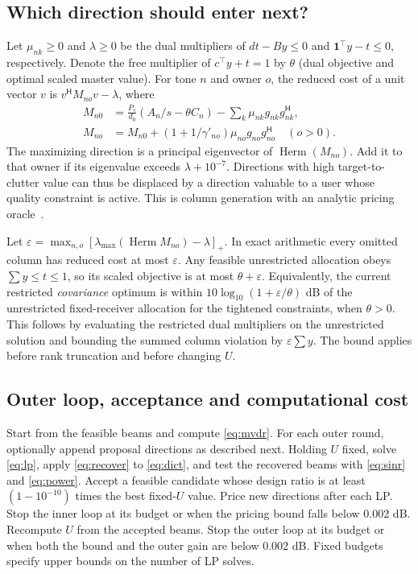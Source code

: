 \documentclass[journal]{IEEEtran}
\DeclareMathOperator{\Herm}{Herm}
\newcommand{\Hh}{^{\mathsf H}}
\begin{document}
\subsection{Which direction should enter next?}
Let $\mu_{nk}\ge0$ and $\lambda\ge0$ be the dual multipliers of $dt-By\le0$ and $\mathbf1^\top y-t\le0$, respectively. Denote the free multiplier of $c^\top y+t=1$ by $\theta$ (dual objective and optimal scaled master value). For tone $n$ and owner $o$, the reduced cost of a unit vector $v$ is $v\Hh M_{no}v-\lambda$, where
\begin{align}
 M_{n0}&=\frac{P_s}{d_0}(A_n/s-\theta C_n)
                -\sum_k\mu_{nk}g_{nk}g_{nk}\Hh,\\
 M_{no}&=M_{n0}+(1+1/\gamma'_{no})\mu_{no}g_{no}g_{no}\Hh
                  \quad(o>0).
\end{align}
The maximizing direction is a principal eigenvector of $\Herm(M_{no})$. Add it to that owner if its eigenvalue exceeds $\lambda+10^{-7}$. Directions with high target-to-clutter value can thus be displaced by a direction valuable to a user whose quality constraint is active. This is column generation with an analytic pricing oracle~\cite{dantzig}.

Let $\varepsilon=\max_{n,o}[\lambda_{\max}(\Herm M_{no})-\lambda]_+$. In exact arithmetic every omitted column has reduced cost at most $\varepsilon$. Any feasible unrestricted allocation obeys $\sum y\le t\le1$, so its scaled objective is at most $\theta+\varepsilon$. Equivalently, the current restricted \emph{covariance} optimum is within $10\log_{10}(1+\varepsilon/\theta)$ dB of the unrestricted fixed-receiver allocation for the tightened constraints, when $\theta>0$. This follows by evaluating the restricted dual multipliers on the unrestricted solution and bounding the summed column violation by $\varepsilon\sum y$. The bound applies before rank truncation and before changing $U$.

\subsection{Outer loop, acceptance and computational cost}
Start from the feasible beams and compute \eqref{eq:mvdr}. For each outer round, optionally append proposal directions as described next. Holding $U$ fixed, solve \eqref{eq:lp}, apply \eqref{eq:recover} to \eqref{eq:dict}, and test the recovered beams with \eqref{eq:sinr} and \eqref{eq:power}. Accept a feasible candidate whose design ratio is at least $(1-10^{-10})$ times the best fixed-$U$ value. Price new directions after each LP. Stop the inner loop at its budget or when the pricing bound falls below $0.002$ dB. Recompute $U$ from the accepted beams. Stop the outer loop at its budget or when both the bound and the outer gain are below $0.002$ dB. Fixed budgets specify upper bounds on the number of LP solves.
\end{document}
